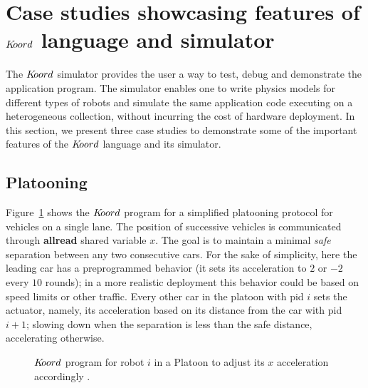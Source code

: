 \section{Case studies showcasing features of $K\kern-2pt oord$ language and simulator}
\label{sec:experims}
The $K\kern-2pt oord$ simulator provides the user a way to test, debug and demonstrate the application program. The simulator enables one to write physics models for different types of robots and simulate the same application code executing on a heterogeneous collection, without incurring the cost of hardware deployment. In this section, we present three case studies to demonstrate some of the important features of the $K\kern-2pt oord$ language and its  simulator.

\subsection{Platooning}
\label{sec:platooning}
Figure~\ref{fig:platooningapp} shows the $K\kern-2pt oord$ program for a simplified platooning protocol for vehicles on a single lane. The position of successive vehicles is communicated through  {\bf allread} shared variable $\mathit{x}$. The goal is to maintain a minimal  \emph{safe} separation  between any two consecutive cars. For the sake of simplicity, here the leading car  has a preprogrammed behavior (it sets its acceleration to $2$ or $-2$ every $10$ rounds); in a more realistic deployment this behavior could be based on speed limits or other traffic. 
Every other car in the platoon with pid $i$ sets the actuator, namely, its acceleration based on its distance from the car with pid $i+1$; slowing down when the separation is less than the safe distance, accelerating otherwise. 

\begin{figure}[ht!]
    \noindent
    \begin{mdframed}
    \begin{center}
        \scriptsize
        {}
        {}
    \end{center}
    \end{mdframed}
    \caption{$K\kern-2pt oord$ program for robot $i$ in a Platoon to adjust its $x$ acceleration accordingly .}
    \label{fig:platooningapp}
\end{figure}

